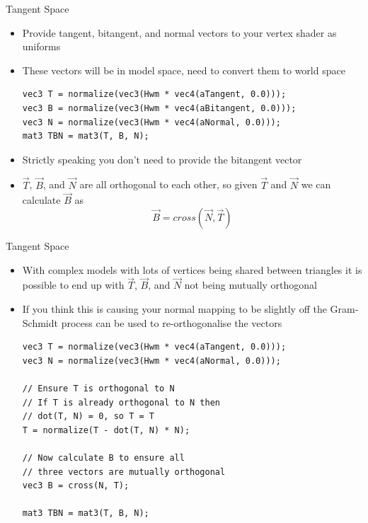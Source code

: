 \documentclass{beamer}
\begin{document}
\begin{frame}[fragile]{Tangent Space}
    \begin{itemize}
        \item Provide tangent, bitangent, and normal vectors to your vertex shader as uniforms
        \item These vectors will be in model space, need to convert them to world space
              \footnotesize{
                  \begin{verbatim}
vec3 T = normalize(vec3(Hwm * vec4(aTangent, 0.0)));
vec3 B = normalize(vec3(Hwm * vec4(aBitangent, 0.0)));
vec3 N = normalize(vec3(Hwm * vec4(aNormal, 0.0)));
mat3 TBN = mat3(T, B, N);
\end{verbatim}
              }
        \item Strictly speaking you don't need to provide the bitangent vector
        \item $\vec{T}$, $\vec{B}$, and $\vec{N}$ are all orthogonal to each other, so given $\vec{T}$ and $\vec{N}$ we can calculate $\vec{B}$ as $$\vec{B} = cross\left(\vec{N}, \vec{T}\right)$$
    \end{itemize}
\end{frame}

\begin{frame}[fragile]{Tangent Space}
    \begin{itemize}
        \item With complex models with lots of vertices being shared between triangles it is possible to end up with $\vec{T}$, $\vec{B}$, and $\vec{N}$ not being mutually orthogonal
        \item If you think this is causing your normal mapping to be slightly off the Gram-Schmidt process can be used to re-orthogonalise the vectors
              \footnotesize{
                  \begin{verbatim}
vec3 T = normalize(vec3(Hwm * vec4(aTangent, 0.0)));
vec3 N = normalize(vec3(Hwm * vec4(aNormal, 0.0)));

// Ensure T is orthogonal to N
// If T is already orthogonal to N then
// dot(T, N) = 0, so T = T
T = normalize(T - dot(T, N) * N);

// Now calculate B to ensure all
// three vectors are mutually orthogonal
vec3 B = cross(N, T);

mat3 TBN = mat3(T, B, N);
\end{verbatim}
              }
    \end{itemize}
\end{frame}
\end{document}
